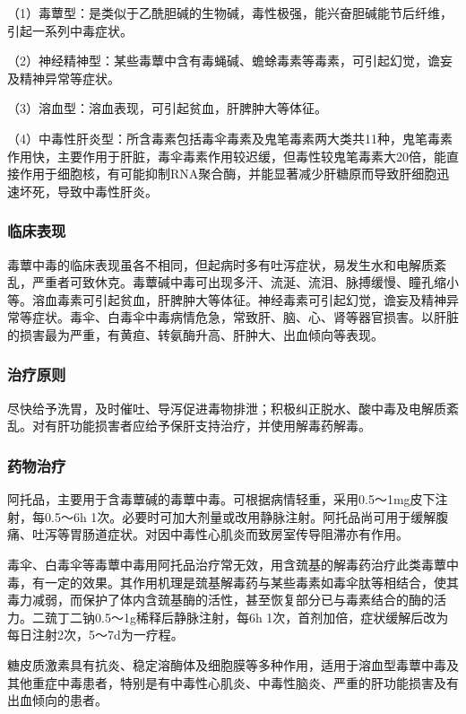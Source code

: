 （1）毒蕈型：是类似于乙酰胆碱的生物碱，毒性极强，能兴奋胆碱能节后纤维，引起一系列中毒症状。

（2）神经精神型：某些毒蕈中含有毒蝇碱、蟾蜍毒素等毒素，可引起幻觉，谵妄及精神异常等症状。

（3）溶血型：溶血表现，可引起贫血，肝脾肿大等体征。

（4）中毒性肝炎型：所含毒素包括毒伞毒素及鬼笔毒素两大类共11种，鬼笔毒素作用快，主要作用于肝脏，毒伞毒素作用较迟缓，但毒性较鬼笔毒素大20倍，能直接作用于细胞核，有可能抑制RNA聚合酶，并能显著减少肝糖原而导致肝细胞迅速坏死，导致中毒性肝炎。

\subsubsection{临床表现}

毒蕈中毒的临床表现虽各不相同，但起病时多有吐泻症状，易发生水和电解质紊乱，严重者可致休克。毒蕈碱中毒可出现多汗、流涎、流泪、脉搏缓慢、瞳孔缩小等。溶血毒素可引起贫血，肝脾肿大等体征。神经毒素可引起幻觉，谵妄及精神异常等症状。毒伞、白毒伞中毒病情危急，常致肝、脑、心、肾等器官损害。以肝脏的损害最为严重，有黄疸、转氨酶升高、肝肿大、出血倾向等表现。

\subsubsection{治疗原则}

尽快给予洗胃，及时催吐、导泻促进毒物排泄；积极纠正脱水、酸中毒及电解质紊乱。对有肝功能损害者应给予保肝支持治疗，并使用解毒药解毒。

\subsubsection{药物治疗}

阿托品，主要用于含毒蕈碱的毒蕈中毒。可根据病情轻重，采用0.5～1mg皮下注射，每0.5～6h
1次。必要时可加大剂量或改用静脉注射。阿托品尚可用于缓解腹痛、吐泻等胃肠道症状。对因中毒性心肌炎而致房室传导阻滞亦有作用。

毒伞、白毒伞等毒蕈中毒用阿托品治疗常无效，用含巯基的解毒药治疗此类毒蕈中毒，有一定的效果。其作用机理是巯基解毒药与某些毒素如毒伞肽等相结合，使其毒力减弱，而保护了体内含巯基酶的活性，甚至恢复部分已与毒素结合的酶的活力。二巯丁二钠0.5～1g稀释后静脉注射，每6h
1次，首剂加倍，症状缓解后改为每日注射2次，5～7d为一疗程。

糖皮质激素具有抗炎、稳定溶酶体及细胞膜等多种作用，适用于溶血型毒蕈中毒及其他重症中毒患者，特别是有中毒性心肌炎、中毒性脑炎、严重的肝功能损害及有出血倾向的患者。